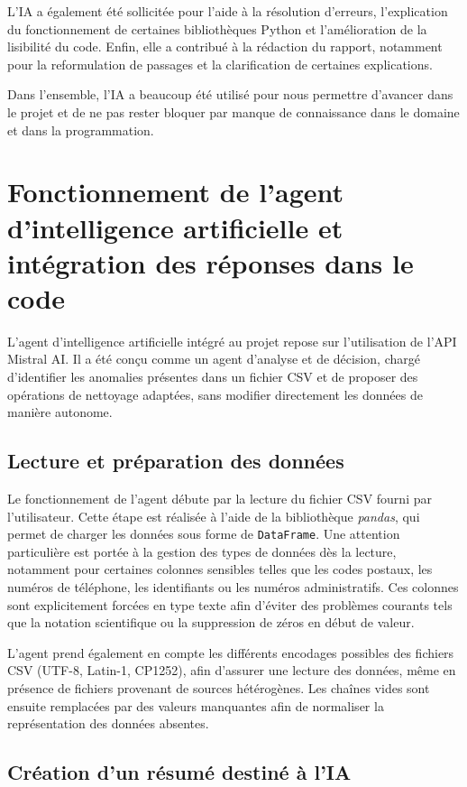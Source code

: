 \documentclass[a4paper, 12pt, twoside]{article}
\begin{document}
L’IA a également été sollicitée pour l’aide à la résolution d’erreurs, l’explication du fonctionnement de certaines bibliothèques Python et l’amélioration de la lisibilité du code. Enfin, elle a contribué à la rédaction du rapport, notamment pour la reformulation de passages et la clarification de certaines explications.

Dans l'ensemble, l'IA a beaucoup été utilisé pour nous permettre d'avancer dans le projet et de ne pas rester bloquer par manque de connaissance dans le domaine et dans la programmation.

\newpage
\section{Fonctionnement de l’agent d’intelligence artificielle et intégration des réponses dans le code}

L’agent d’intelligence artificielle intégré au projet repose sur l’utilisation de l’API Mistral AI. Il a été conçu comme un agent d’analyse et de décision, chargé d’identifier les anomalies présentes dans un fichier CSV et de proposer des opérations de nettoyage adaptées, sans modifier directement les données de manière autonome.

\subsection{Lecture et préparation des données}

Le fonctionnement de l’agent débute par la lecture du fichier CSV fourni par l’utilisateur. Cette étape est réalisée à l’aide de la bibliothèque \textit{pandas}, qui permet de charger les données sous forme de \texttt{DataFrame}. Une attention particulière est portée à la gestion des types de données dès la lecture, notamment pour certaines colonnes sensibles telles que les codes postaux, les numéros de téléphone, les identifiants ou les numéros administratifs. Ces colonnes sont explicitement forcées en type texte afin d’éviter des problèmes courants tels que la notation scientifique ou la suppression de zéros en début de valeur.

L’agent prend également en compte les différents encodages possibles des fichiers CSV (UTF-8, Latin-1, CP1252), afin d’assurer une lecture des données, même en présence de fichiers provenant de sources hétérogènes. Les chaînes vides sont ensuite remplacées par des valeurs manquantes afin de normaliser la représentation des données absentes.

\subsection{Création d’un résumé destiné à l’IA}
\end{document}
